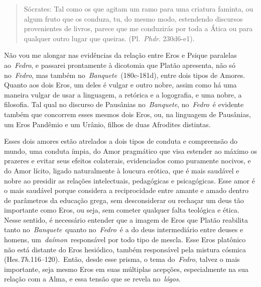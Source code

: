  

\begin{quote}
Sócrates: \redondo{[…]} Tal como os que agitam um ramo para uma
criatura faminta, ou algum fruto que os conduza, tu, do mesmo modo,
estendendo discursos provenientes de livros, parece que me conduzirás
por toda a Ática ou para qualquer outro lugar que queiras.
(Pl.~\emph{Phdr}. 230d6-e1).
\end{quote}

 

Não vou me alongar nas evidências da relação entre Eros e Psique
paralelas ao~\emph{Fedro}, e passarei prontamente à dicotomia que Platão
apresenta, não só no~\emph{Fedro}, mas também
no~\emph{Banquete~}(180c-181d), entre dois tipos de Amores. Quanto aos
dois Eros, um deles é vulgar e outro nobre, assim como há uma maneira
vulgar de usar a linguagem, a retórica e a logografia, e uma nobre, a
filosofia. Tal qual no discurso de Pausânias no~\emph{Banquete},
no~\emph{Fedro}~é evidente também que concorrem esses mesmos dois Eros,
ou, na linguagem de Pausânias, um Eros Pandêmio e um Urânio, filhos de
duas Afrodites distintas.

Esses dois amores estão atrelados a dois tipos de conduta e compreensão
do mundo, uma conduta ímpia, do Amor pragmático que visa estender ao
máximo os prazeres e evitar seus efeitos colaterais, evidenciados como
puramente nocivos, e do Amor lícito, ligado naturalmente à loucura
erótica, que é mais saudável e nobre ao presidir as relações
intelectuais, pedagógicas e psicagógicas. Esse amor é o mais saudável
porque considera a reciprocidade entre amante e amado dentro de
parâmetros da educação grega, sem desconsiderar ou rechaçar um deus tão
importante como Eros, ou seja, sem cometer qualquer falta teológica e
ética. Nesse sentido, é necessário entender que a imagem de Eros que
Platão reabilita tanto no~\emph{Banquete}~quanto no~\emph{Fedro}~é a do
deus intermediário entre deuses e homens, um~\emph{daímon}~responsável
por todo tipo de mescla. Esse Eros platônico não está distante do Eros
hesiódico, também responsável pela mistura cósmica
(Hes.\emph{Th}.116--120).~Então, desde esse prisma, o tema
do~\emph{Fedro}, talvez o mais importante, seja mesmo Eros em suas
múltiplas acepções, especialmente na sua relação com a Alma, e essa
tensão que se revela no~\emph{lógos}.

